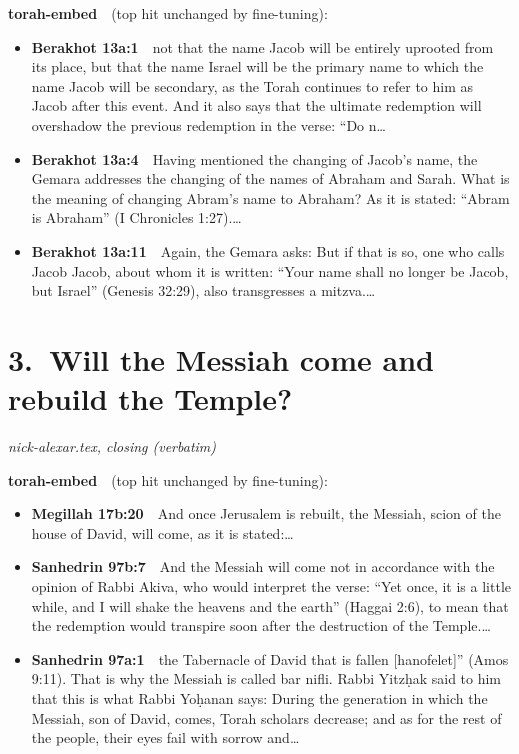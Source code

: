 \documentclass[11pt,a4paper]{article}
\begin{document}
{\color{quiet}\small\textbf{torah-embed}\ \ (top hit unchanged by fine-tuning):}
\begin{itemize}[leftmargin=1.2em,itemsep=3pt]
\item {\color{ref}\textbf{Berakhot 13a:1}}\ \ not that the name Jacob will be entirely uprooted from its place, but that the name Israel will be the primary name to which the name Jacob will be secondary, as the Torah continues to refer to him as Jacob after this event. And it also says that the ultimate redemption will overshadow the previous redemption in the verse: “Do n\ldots
\item {\color{ref}\textbf{Berakhot 13a:4}}\ \ Having mentioned the changing of Jacob’s name, the Gemara addresses the changing of the names of Abraham and Sarah. What is the meaning of changing Abram’s name to Abraham? As it is stated: “Abram is Abraham” (I Chronicles 1:27).\ldots
\item {\color{ref}\textbf{Berakhot 13a:11}}\ \ Again, the Gemara asks: But if that is so, one who calls Jacob Jacob, about whom it is written: “Your name shall no longer be Jacob, but Israel” (Genesis 32:29), also transgresses a mitzva.\ldots
\end{itemize}

\section*{3.\ Will the Messiah come and rebuild the Temple?}
{\color{quiet}\small\textit{nick-alexar.tex, closing (verbatim)}}

{\color{quiet}\small\textbf{torah-embed}\ \ (top hit unchanged by fine-tuning):}
\begin{itemize}[leftmargin=1.2em,itemsep=3pt]
\item {\color{ref}\textbf{Megillah 17b:20}}\ \ And once Jerusalem is rebuilt, the Messiah, scion of the house of David, will come, as it is stated:\ldots
\item {\color{ref}\textbf{Sanhedrin 97b:7}}\ \ And the Messiah will come not in accordance with the opinion of Rabbi Akiva, who would interpret the verse: “Yet once, it is a little while, and I will shake the heavens and the earth” (Haggai 2:6), to mean that the redemption would transpire soon after the destruction of the Temple.\ldots
\item {\color{ref}\textbf{Sanhedrin 97a:1}}\ \ the Tabernacle of David that is fallen [hanofelet]” (Amos 9:11). That is why the Messiah is called bar nifli. Rabbi Yitzḥak said to him that this is what Rabbi Yoḥanan says: During the generation in which the Messiah, son of David, comes, Torah scholars decrease; and as for the rest of the people, their eyes fail with sorrow and\ldots
\end{itemize}
\end{document}
